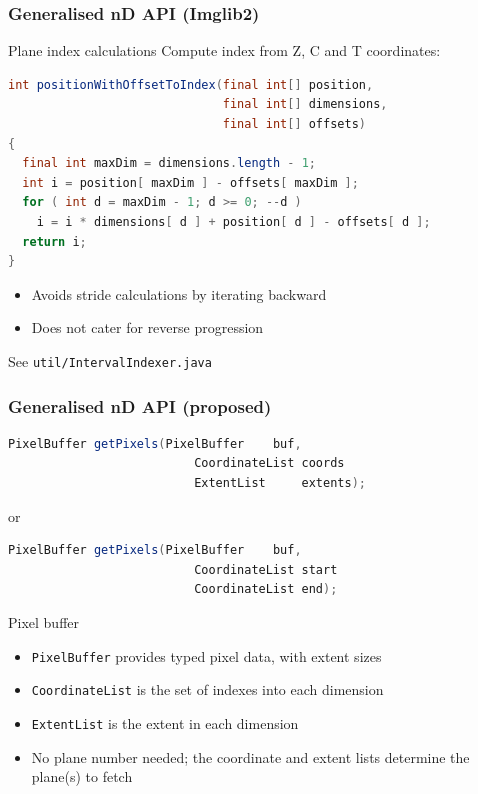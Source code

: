 \documentclass{beamer}
\newcommand{\filename}[1]{\texttt{#1}}
\newcommand{\class}[1]{\texttt{#1}}
\begin{document}
\begin{frame}[fragile]
  \frametitle{Generalised nD API (Imglib2)}
  \begin{block}{Plane index calculations}
    Compute index from Z, C and T coordinates:
    \begin{lstlisting}[language=Java]
int positionWithOffsetToIndex(final int[] position,
                              final int[] dimensions,
                              final int[] offsets)
{
  final int maxDim = dimensions.length - 1;
  int i = position[ maxDim ] - offsets[ maxDim ];
  for ( int d = maxDim - 1; d >= 0; --d )
    i = i * dimensions[ d ] + position[ d ] - offsets[ d ];
  return i;
}
    \end{lstlisting}
    \begin{itemize}
    \item Avoids stride calculations by iterating backward
    \item Does not cater for reverse progression
    \end{itemize}
  See \filename{util/IntervalIndexer.java}
  \end{block}
\end{frame}

\begin{frame}[fragile]
  \frametitle{Generalised nD API (proposed)}
  \begin{lstlisting}[language=Java]
    PixelBuffer getPixels(PixelBuffer    buf,
                          CoordinateList coords
                          ExtentList     extents);
  \end{lstlisting}
  or
  \begin{lstlisting}[language=Java]
    PixelBuffer getPixels(PixelBuffer    buf,
                          CoordinateList start
                          CoordinateList end);
  \end{lstlisting}
  \begin{block}{Pixel buffer}
    \begin{itemize}
    \item \class{PixelBuffer} provides typed pixel data, with extent sizes
    \item \class{CoordinateList} is the set of indexes into each dimension
    \item \class{ExtentList} is the extent in each dimension
    \item No plane number needed; the coordinate and extent lists
      determine the plane(s) to fetch
    \end{itemize}
  \end{block}
\end{frame}
\end{document}
